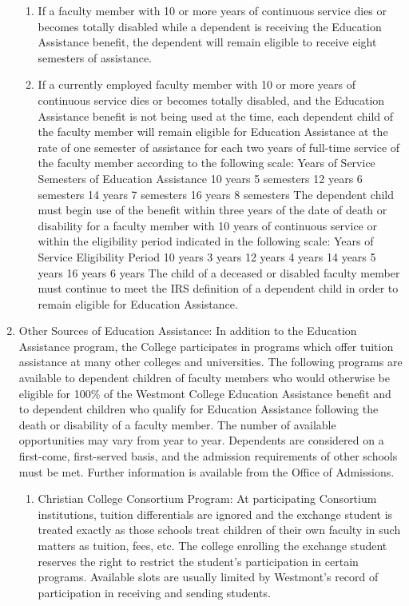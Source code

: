 \documentclass[letterpaper, 11pt]{article}
\begin{document}
\begin{enumerate}[label=\alph*)]
{\begin{enumerate}[label=\arabic*)]
							\item{If a faculty member with 10 or more years of continuous service dies or becomes totally disabled while a dependent is receiving the Education Assistance benefit, the dependent will remain eligible to receive eight semesters of assistance.}
							\item{If a currently employed faculty member with 10 or more years of continuous service dies or becomes totally disabled, and the Education Assistance benefit is not being used at the time, each dependent child of the faculty member will remain eligible for Education Assistance at the rate of one semester of assistance for each two years of full-time service of the faculty member according to the following scale:}
							Years of Service			Semesters of Education Assistance
							10 years				5 semesters
							12 years				6 semesters
							14 years				7 semesters
							16 years				8 semesters
							The dependent child must begin use of the benefit within three years of the date of death or disability for a faculty member with 10 years of continuous service or within the eligibility period indicated in the following scale:
							Years of Service			Eligibility Period
							10 years				3 years
							12 years				4 years
							14 years				5 years
							16 years				6 years
							The child of a deceased or disabled faculty member must continue to meet the IRS definition of a dependent child in order to remain eligible for Education Assistance.
						\end{enumerate}
					}
					\item{Other Sources of Education Assistance:
						In addition to the Education Assistance program, the College participates in programs which offer tuition assistance at many other colleges and universities.  The following programs are available to dependent children of faculty members who would otherwise be eligible for 100\% of the Westmont College Education Assistance benefit and to dependent children who qualify for Education Assistance following the death or disability of a faculty member.  The number of available opportunities may vary from year to year.  Dependents are considered on a first-come, first-served basis, and the admission requirements of other schools must be met. Further information is available from the Office of Admissions.
						\begin{enumerate}[label=\arabic*)]
							\item{Christian College Consortium Program:  At participating Consortium institutions, tuition differentials are ignored and the exchange student is treated exactly as those schools treat children of their own faculty in such matters as tuition, fees, etc.  The college enrolling the exchange student reserves the right to restrict the student's participation in certain programs.  Available slots are usually limited by Westmont's record of participation in receiving and sending students.}

\end{enumerate}}
\end{enumerate}
\end{document}
